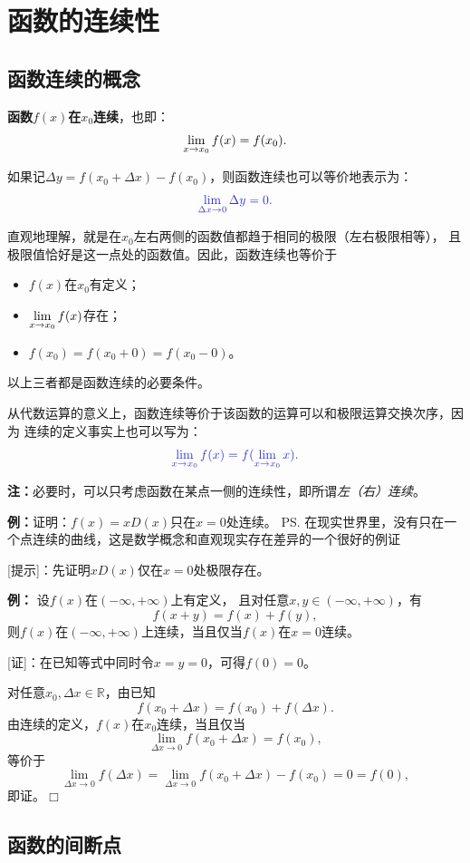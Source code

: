 \section{函数的连续性}

\subsection{函数连续的概念}

\begin{thx}
{\bf 函数$f(x)$在$x_0$连续}，也即：
	$$\lim\limits_{x\to{x_0}}f(x)=f(x_0).$$
\end{thx}
如果记$\Delta y=f(x_0+\Delta x)-f(x_0)$，则函数连续也可以等价地表示为：
$$\b\lim\limits_{\Delta x\to 0}\Delta y=0.$$

直观地理解，就是在$x_0$左右两侧的函数值都趋于相同的极限（左右极限相等），
且极限值恰好是这一点处的函数值。因此，函数连续也等价于
\begin{itemize}
  \setlength{\itemindent}{1cm}
  \item $f(x)$在$x_0$有定义； 
  \item $\lim\limits_{x\to{x_0}}f(x)$存在； 
  \item $f(x_0)=f(x_0+0)=f(x_0-0)$。
\end{itemize}
以上三者都是函数连续的必要条件。

从代数运算的意义上，函数连续等价于该函数的运算可以和极限运算交换次序，因为
连续的定义事实上也可以写为：
$$\b\limx{x_0}f(x)=f(\limx{x_0}x).$$

{\bf 注：}必要时，可以只考虑函数在某点一侧的连续性，即所谓{\it 左（右）连续}。

{\bf 例：}证明：$f(x)=xD(x)$只在$x=0$处连续。
\ps{在现实世界里，没有只在一个点连续的曲线，这是数学概念和直观现实存在差异的一个很好的例证}

[提示]：先证明$xD(x)$仅在$x=0$处极限存在。

{\bf 例：}
设$f(x)$在$(-\infty,+\infty)$上有定义，
且对任意$x,y\in (-\infty,+\infty)$，有
$$f(x+y)=f(x)+f(y),$$
则$f(x)$在$(-\infty,+\infty)$上连续，当且仅当$f(x)$在$x=0$连续。

[证]：在已知等式中同时令$x=y=0$，可得$f(0)=0$。

对任意$x_0,\Delta x\in\mathbb{R}$，由已知
$$f(x_0+\Delta x)=f(x_0)+f(\Delta x).$$
由连续的定义，$f(x)$在$x_0$连续，当且仅当
$$\lim\limits_{\Delta x\to 0}f(x_0+\Delta x)=f(x_0),$$
等价于
$$\lim\limits_{\Delta x\to 0}f(\Delta x)
=\lim\limits_{\Delta x\to 0}f(x_0+\Delta x)-f(x_0)=0=f(0),$$
即证。\hfill$\Box$


\subsection{函数的间断点}

